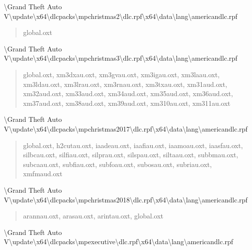 \documentclass[]{scrartcl}
\begin{document}
\textbackslash{}Grand Theft Auto V\textbackslash{}update\textbackslash{}x64\textbackslash{}dlcpacks\textbackslash{}mpchristmas2\textbackslash{}dlc.rpf\textbackslash{}x64\textbackslash{}data\textbackslash{}lang\textbackslash{}americandlc.rpf

\begin{quote}
   \ttfamily
   global.oxt
\end{quote}

\textbackslash{}Grand Theft Auto V\textbackslash{}update\textbackslash{}x64\textbackslash{}dlcpacks\textbackslash{}mpchristmas3\textbackslash{}dlc.rpf\textbackslash{}x64\textbackslash{}data\textbackslash{}lang\textbackslash{}americandlc.rpf

\begin{quote}
   \ttfamily
   global.oxt, xm3dxau.oxt, xm3gvau.oxt, xm3igau.oxt, xm3laau.oxt, xm3ldau.oxt, xm3lrau.oxt, xm3rnau.oxt, xm3txau.oxt, xm31aud.oxt, xm32aud.oxt, xm33aud.oxt, xm34aud.oxt, xm35aud.oxt, xm36aud.oxt, xm37aud.oxt, xm38aud.oxt, xm39aud.oxt, xm310au.oxt, xm311au.oxt
\end{quote}

\textbackslash{}Grand Theft Auto V\textbackslash{}update\textbackslash{}x64\textbackslash{}dlcpacks\textbackslash{}mpchristmas2017\textbackslash{}dlc.rpf\textbackslash{}x64\textbackslash{}data\textbackslash{}lang\textbackslash{}americandlc.rpf

\begin{quote}
   \ttfamily
   global.oxt, h2cutau.oxt, iaadeau.oxt, iaafiau.oxt, iaamoau.oxt, iaasfau.oxt, silbcau.oxt, silfiau.oxt, silprau.oxt, silspau.oxt, siltaau.oxt, subbmau.oxt, subcaau.oxt, subfiau.oxt, subfoau.oxt, subosau.oxt, subriau.oxt, xmfmaud.oxt
\end{quote}

\textbackslash{}Grand Theft Auto V\textbackslash{}update\textbackslash{}x64\textbackslash{}dlcpacks\textbackslash{}mpchristmas2018\textbackslash{}dlc.rpf\textbackslash{}x64\textbackslash{}data\textbackslash{}lang\textbackslash{}americandlc.rpf

\begin{quote}
   \ttfamily
   arannau.oxt, arasau.oxt, arintau.oxt, global.oxt
\end{quote}

\textbackslash{}Grand Theft Auto V\textbackslash{}update\textbackslash{}x64\textbackslash{}dlcpacks\textbackslash{}mpexecutive\textbackslash{}dlc.rpf\textbackslash{}x64\textbackslash{}data\textbackslash{}lang\textbackslash{}americandlc.rpf
\end{document}
